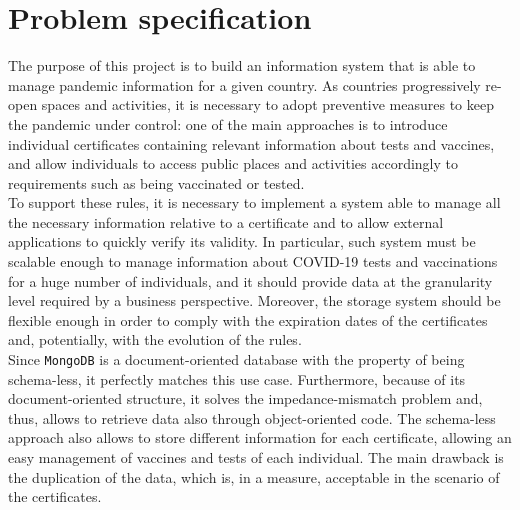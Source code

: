 \documentclass{article}
\begin{document}
\section{Problem specification}
The purpose of this project is to build an information system that is able to manage pandemic information for a given country. As countries progressively re-open spaces and activities, it is necessary to adopt preventive measures to keep the pandemic under control: one of the main approaches is to introduce individual certificates containing relevant information about tests and vaccines, and allow individuals to access public places and activities accordingly to requirements such as being vaccinated or tested.\\
To support these rules, it is necessary to implement a system able to manage all the necessary information relative to a certificate and to allow external applications to quickly verify its validity.
In particular, such system must be scalable enough to manage information about COVID-19 tests and vaccinations for a huge number of individuals, and it should provide data at the granularity level required by a business perspective. Moreover, the storage system should be flexible enough in order to comply with the expiration dates of the certificates and, potentially, with the evolution of the rules.\\
Since \verb|MongoDB| is a document-oriented database with the property of being schema-less, it perfectly matches this use case. Furthermore, because of its document-oriented structure, it solves the impedance-mismatch problem and, thus, allows to retrieve data also through object-oriented code. The schema-less approach also allows to store different information for each certificate, allowing an easy management of vaccines and tests of each individual. The main drawback is the duplication of the data, which is, in a measure, acceptable in the scenario of the certificates.
\end{document}
